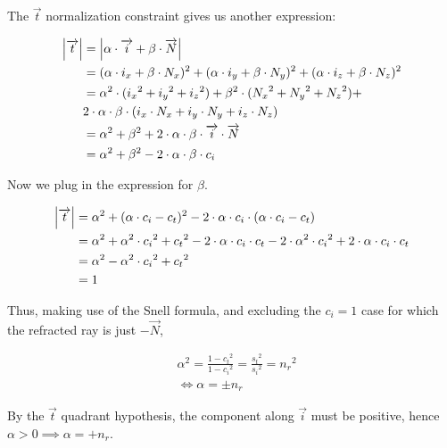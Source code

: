 The $\overrightarrow{t}$ normalization constraint gives us another expression:

\begin{equation} \begin{split}
\abs{\overrightarrow{t}} &= \abs{\alpha \cdot \overrightarrow{i}
                                 + \beta \cdot \overrightarrow{N}} \\
&= (\alpha \cdot i_x + \beta \cdot N_x)^2 +
   (\alpha \cdot i_y + \beta \cdot N_y)^2 +
   (\alpha \cdot i_z + \beta \cdot N_z)^2 \\
&= \alpha^2 \cdot ({i_x}^2 + {i_y}^2 + {i_z}^2) +
   \beta^2 \cdot ({N_x}^2 + {N_y}^2 + {N_z}^2) + \\
   & 2 \cdot \alpha \cdot \beta \cdot
     (i_x \cdot N_x + i_y \cdot N_y + i_z \cdot N_z) \\
&= \alpha^2 + \beta^2 + 2 \cdot \alpha \cdot \beta \cdot \overrightarrow{i}
   \cdot \overrightarrow{N} \\
&= \alpha^2 + \beta^2 - 2 \cdot \alpha \cdot \beta \cdot c_i
\end{split} \end{equation}

Now we plug in the expression for $\beta$.

\begin{equation} \begin{split}
\abs{\overrightarrow{t}} &=
\alpha^2 + (\alpha \cdot c_i - c_t)^2 - 2 \cdot \alpha \cdot c_i \cdot
(\alpha \cdot c_i - c_t) \\
&= \alpha^2 + \alpha^2 \cdot {c_i}^2 + {c_t}^2
- 2 \cdot \alpha \cdot c_i \cdot c_t - 2 \cdot \alpha^2 \cdot {c_i}^2
+ 2 \cdot \alpha \cdot c_i \cdot c_t \\
&= \alpha^2 - \alpha^2 \cdot {c_i}^2 + {c_t}^2 \\
&= 1
\end{split} \end{equation}

Thus, making use of the Snell formula, and excluding the $c_i = 1$ case
for which the refracted ray is just $- \overrightarrow{N}$,

\begin{equation} \begin{split}
& \alpha^2 = \frac{1 - {c_t}^2}{1 - {c_i}^2} = \frac{{s_t}^2}{{s_i}^2} =
  {n_r}^2 \\
& \iff \alpha = \pm n_r
\end{split} \end{equation}

By the $\overrightarrow{t}$ quadrant hypothesis, the component along
$\overrightarrow{i}$ must be positive, hence $\alpha > 0 \implies \alpha = +
n_r$.

